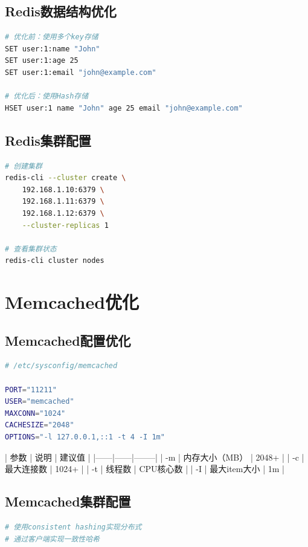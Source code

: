 \documentclass[12pt,UTF8]{ctexbook}
\begin{document}
\subsection*{Redis数据结构优化}

\begin{lstlisting}[language=bash]
# 优化前：使用多个key存储
SET user:1:name "John"
SET user:1:age 25
SET user:1:email "john@example.com"

# 优化后：使用Hash存储
HSET user:1 name "John" age 25 email "john@example.com"
\end{lstlisting}

\subsection*{Redis集群配置}

\begin{lstlisting}[language=bash]
# 创建集群
redis-cli --cluster create \
    192.168.1.10:6379 \
    192.168.1.11:6379 \
    192.168.1.12:6379 \
    --cluster-replicas 1

# 查看集群状态
redis-cli cluster nodes
\end{lstlisting}

\section{Memcached优化}
\label{sec:memcached-tuning}

\subsection*{Memcached配置优化}

\begin{lstlisting}[language=bash]
# /etc/sysconfig/memcached

PORT="11211"
USER="memcached"
MAXCONN="1024"
CACHESIZE="2048"
OPTIONS="-l 127.0.0.1,::1 -t 4 -I 1m"
\end{lstlisting}

| 参数 | 说明 | 建议值 |
|------|------|--------|
| -m | 内存大小（MB） | 2048+ |
| -c | 最大连接数 | 1024+ |
| -t | 线程数 | CPU核心数 |
| -I | 最大item大小 | 1m |

\subsection*{Memcached集群配置}

\begin{lstlisting}[language=bash]
# 使用consistent hashing实现分布式
# 通过客户端实现一致性哈希
\end{lstlisting}
\end{document}
